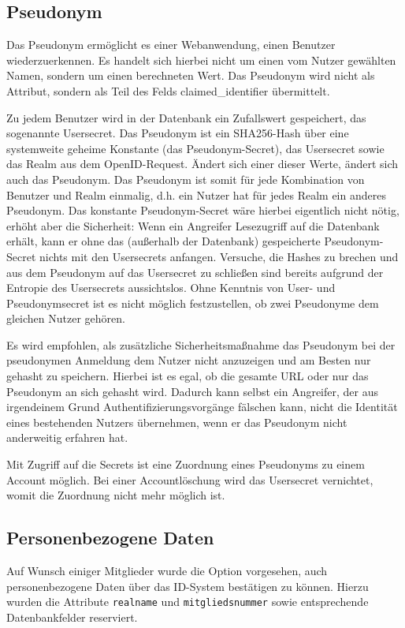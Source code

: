 \subsection{Pseudonym}
\label{sec:pseudo}
Das Pseudonym ermöglicht es einer Webanwendung, einen Benutzer wiederzuerkennen.
Es handelt sich hierbei nicht um einen vom Nutzer gewählten Namen, sondern um einen berechneten Wert.
Das Pseudonym wird nicht als Attribut, sondern als Teil des Felds claimed\_identifier übermittelt.

Zu jedem Benutzer wird in der Datenbank ein Zufallswert gespeichert, das sogenannte Usersecret. 
Das Pseudonym ist ein SHA256-Hash über eine systemweite geheime Konstante (das Pseudonym-Secret), das Usersecret sowie das Realm aus dem OpenID-Request.
Ändert sich einer dieser Werte, ändert sich auch das Pseudonym.
Das Pseudonym ist somit für jede Kombination von Benutzer und Realm einmalig, d.h. ein Nutzer hat für jedes Realm ein anderes Pseudonym.
Das konstante Pseudonym-Secret wäre hierbei eigentlich nicht nötig, erhöht aber die Sicherheit:
Wenn ein Angreifer Lesezugriff auf die Datenbank erhält, kann er ohne das (außerhalb der Datenbank) gespeicherte Pseudonym-Secret nichts mit den Usersecrets anfangen.
Versuche, die Hashes zu brechen und aus dem Pseudonym auf das Usersecret zu schließen sind bereits aufgrund der Entropie des Usersecrets aussichtslos.
Ohne Kenntnis von User- und Pseudonymsecret ist es nicht möglich festzustellen, ob zwei Pseudonyme dem gleichen Nutzer gehören.

Es wird empfohlen, als zusätzliche Sicherheitsmaßnahme das Pseudonym bei der pseudonymen Anmeldung dem Nutzer nicht anzuzeigen und am Besten nur gehasht zu speichern.
Hierbei ist es egal, ob die gesamte URL oder nur das Pseudonym an sich gehasht wird.
Dadurch kann selbst ein Angreifer, der aus irgendeinem Grund Authentifizierungsvorgänge fälschen kann, nicht die Identität eines bestehenden Nutzers übernehmen,
wenn er das Pseudonym nicht anderweitig erfahren hat.

Mit Zugriff auf die Secrets ist eine Zuordnung eines Pseudonyms zu einem Account möglich.
Bei einer Accountlöschung wird das Usersecret vernichtet, womit die Zuordnung nicht mehr möglich ist.

\subsection{Personenbezogene Daten}
Auf Wunsch einiger Mitglieder wurde die Option vorgesehen, auch personenbezogene Daten über das ID-System bestätigen zu können.
Hierzu wurden die Attribute \texttt{realname} und \texttt{mitgliedsnummer} sowie entsprechende Datenbankfelder reserviert.

